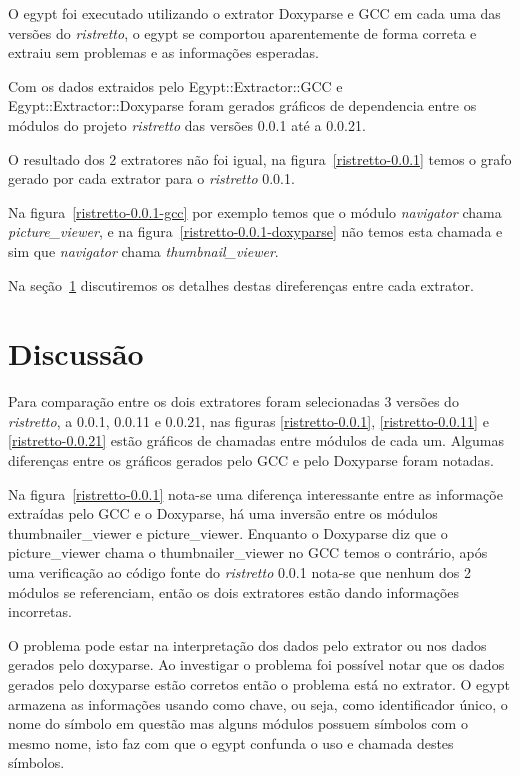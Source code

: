O egypt foi executado utilizando o extrator Doxyparse e GCC em cada uma das versões
do {\it ristretto}, o egypt se comportou aparentemente de forma correta e extraiu sem problemas
e as informações esperadas.

Com os dados extraidos pelo Egypt::Extractor::GCC e Egypt::Extractor::Doxyparse
foram gerados gráficos de dependencia entre os módulos do projeto {\it ristretto} das
versões 0.0.1 até a 0.0.21.

O resultado dos 2 extratores não foi igual, na figura~\ref{ristretto-0.0.1}
temos o grafo gerado por cada extrator para o {\it ristretto} 0.0.1.


Na figura~\ref{ristretto-0.0.1-gcc} por exemplo temos que o módulo {\it
navigator} chama {\it picture\_viewer}, e na
figura~\ref{ristretto-0.0.1-doxyparse} não temos esta chamada e sim que {\it
navigator} chama {\it thumbnail\_viewer}.

Na seção~\ref{sec:discussao} discutiremos os detalhes destas direferenças entre
cada extrator.

\section{Discussão} \label{sec:discussao}

Para comparação entre os dois extratores foram selecionadas 3 versões do
{\it ristretto}, a 0.0.1, 0.0.11 e 0.0.21, nas figuras \ref{ristretto-0.0.1},
\ref{ristretto-0.0.11} e \ref{ristretto-0.0.21} estão gráficos de chamadas
entre módulos de cada um. Algumas diferenças entre os gráficos
gerados pelo GCC e pelo Doxyparse foram notadas. 


Na figura~\ref{ristretto-0.0.1} nota-se uma diferença interessante entre as
informaçõe extraídas pelo GCC e o Doxyparse, há uma inversão entre os módulos
thumbnailer\_viewer e picture\_viewer. Enquanto o Doxyparse diz que o
picture\_viewer chama o thumbnailer\_viewer no GCC temos o contrário, após uma
verificação ao código fonte do {\it ristretto} 0.0.1 nota-se que nenhum dos 2 módulos
se referenciam, então os dois extratores estão dando informações incorretas.

O problema pode estar na interpretação dos dados pelo extrator ou nos dados
gerados pelo doxyparse. Ao investigar o problema foi possível notar que os
dados gerados pelo doxyparse estão corretos então o problema está no extrator. O
egypt armazena as informações usando como chave, ou seja, como identificador
único, o nome do símbolo em questão mas alguns módulos possuem símbolos com o
mesmo nome, isto faz com que o egypt confunda o uso e chamada destes símbolos.

